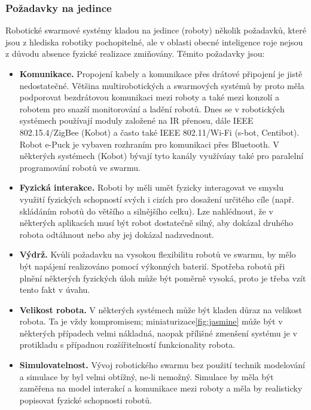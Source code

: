\documentclass[a4paper,12pt]{article}
\begin{document}
\subsubsection{Požadavky na jedince}
Robotické swarmové systémy kladou na jedince (roboty) několik požadavků, které jsou
z hlediska robotiky pochopitelné, ale v oblasti obecné inteligence roje nejsou z důvodu
absence fyzické realizace zmiňovány. Těmito požadavky jsou:
\begin{itemize}
  \item {\bf Komunikace.} Propojení kabely a komunikace přes drátové připojení je jistě
    nedostatečné. Většina multirobotických a swarmových systémů by proto měla podporovat
    bezdrátovou komunikaci mezi roboty a také mezi konzolí a robotem pro snazší monitorování
    a ladění robotů. Dnes se v robotických systémech používají moduly založené na IR přenosu,
    dále IEEE 802.15.4/ZigBee (Kobot) a často také IEEE 802.11/Wi-Fi (s-bot, Centibot).
    Robot e-Puck je vybaven rozhraním pro komunikaci přes Bluetooth. V některých systémech
    (Kobot) bývají tyto kanály využívány také pro paralelní programování robotů ve swarmu.
  \item {\bf Fyzická interakce.} Roboti by měli umět fyzicky interagovat ve smyslu využití
    fyzických schopností svých i cizích pro dosažení určitého cíle (např. skládáním robotů
    do většího a silnějšího celku). Lze nahlédnout, že v některých aplikacích musí být robot
    dostatečně silný, aby dokázal druhého robota odtáhnout nebo aby jej dokázal nadzvednout.
  \item {\bf Výdrž.} Kvůli požadavku na vysokou flexibilitu robotů ve swarmu, by mělo být
    napájení realizováno pomocí výkonných baterií. Spotřeba robotů při plnění některých
    fyzických úloh může být poměrně vysoká, proto je třeba vzít tento fakt v úvahu.
  \item {\bf Velikost robota.} V některých systémech může být kladen důraz na velikost robota.
    Ta je vždy kompromisem; miniaturizace\ref{fig:jasmine} může být v některých případech velmi nákladná,
    naopak přílišné zmenšení systému je v protikladu s případnou rozšířitelností funkcionality
    robota.
  \item {\bf Simulovatelnost.} Vývoj robotického swarmu bez použití technik modelování
    a simulace by byl velmi obtížný, ne-li nemožný. Simulace by měla být zaměřena na
    model interakcí a komunikace mezi roboty a měla by realisticky popisovat fyzické
    schopnosti robotů.
\end{itemize}
\end{document}
